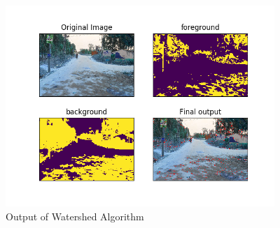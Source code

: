 \documentclass[12pt,a4paper]{article}
\begin{document}
\begin{itemize}

    \begin{figure}[ht!]
        \centering
        \includegraphics[width = 4in]{images/watershed_5.png}
        \caption{Output of Watershed Algorithm}
    \end{figure}
    
    

    


\newpage
    

\end{itemize}
\end{document}
